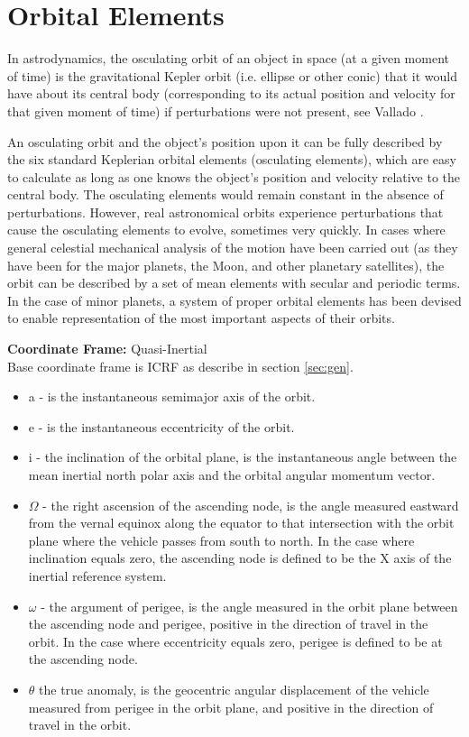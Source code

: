
\section{Orbital Elements} \label{sec:orb} 
In astrodynamics, the osculating orbit of an object in space (at a given moment of time) is the gravitational Kepler orbit (i.e. ellipse or other conic) that it would have about its central body (corresponding to its actual position and velocity for that given moment of time) if perturbations were not present, see Vallado \cite{Vallado}.

An osculating orbit and the object's position upon it can be fully described by the six standard Keplerian orbital elements (osculating elements), which are easy to calculate as long as one knows the object's position and velocity relative to the central body. The osculating elements would remain constant in the absence of perturbations. However, real astronomical orbits experience perturbations that cause the osculating elements to evolve, sometimes very quickly. In cases where general celestial mechanical analysis of the motion have been carried out (as they have been for the major planets, the Moon, and other planetary satellites), the orbit can be described by a set of mean elements with secular and periodic terms. In the case of minor planets, a system of proper orbital elements has been devised to enable representation of the most important aspects of their orbits.

\textbf{Coordinate Frame:} Quasi-Inertial\\
Base coordinate frame is ICRF as describe in section \ref{sec:gen}.

\begin{itemize}
\item a - is the instantaneous semimajor axis of the orbit.
\item e - is the instantaneous eccentricity of the orbit.
\item i - the inclination of the orbital plane, is the instantaneous angle between the mean inertial north polar axis and the orbital angular momentum vector.
\item $\Omega$ - the right ascension of the ascending node, is the angle measured
eastward from the vernal equinox along the equator to that intersection with
the orbit plane where the vehicle passes from south to north. In the case
where inclination equals zero, the ascending node is defined to be the
X axis of the inertial reference system.
\item $\omega$ -  the argument of perigee, is the angle measured in the orbit plane between the ascending node and perigee, positive in the direction of travel in the orbit. In the case where eccentricity equals zero, perigee is defined to be at the ascending node.
\item $\theta$ the true anomaly, is the geocentric angular displacement of the vehicle measured from perigee in the orbit plane, and positive in the direction of travel in the orbit.
\end{itemize}


